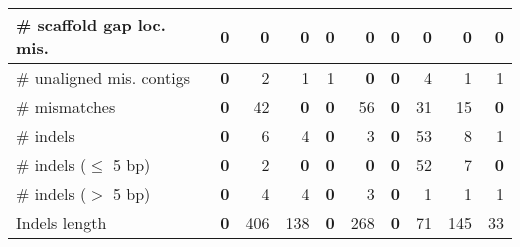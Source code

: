 \documentclass[12pt,a4paper]{article}
\begin{document}
\begin{table}[ht]
\begin{center}
\begin{tabular}{|l*{9}{|r}|}
\# scaffold gap loc. mis. & 0 & 0 & 0 & 0 & 0 & 0 & 0 & 0 & 0 \\ \hline
\# unaligned mis. contigs & {\bf 0} & 2 & 1 & 1 & {\bf 0} & {\bf 0} & 4 & 1 & 1 \\ \hline
\# mismatches & {\bf 0} & 42 & {\bf 0} & {\bf 0} & 56 & {\bf 0} & 31 & 15 & {\bf 0} \\ \hline
\# indels & {\bf 0} & 6 & 4 & {\bf 0} & 3 & {\bf 0} & 53 & 8 & 1 \\ \hline
\hspace{5mm}\# indels ($\leq$ 5 bp) & {\bf 0} & 2 & {\bf 0} & {\bf 0} & {\bf 0} & {\bf 0} & 52 & 7 & {\bf 0} \\ \hline
\hspace{5mm}\# indels ($>$ 5 bp) & {\bf 0} & 4 & 4 & {\bf 0} & 3 & {\bf 0} & 1 & 1 & 1 \\ \hline
Indels length & {\bf 0} & 406 & 138 & {\bf 0} & 268 & {\bf 0} & 71 & 145 & 33 \\ \hline
\end{tabular}
\end{center}
\end{table}
\end{document}
